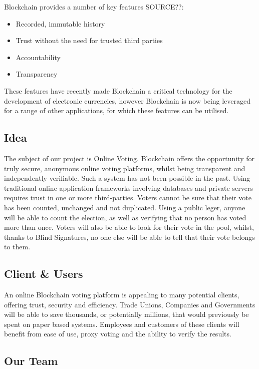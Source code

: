 \documentclass{article}
\begin{document}
\par

Blockchain provides a number of key features SOURCE??:
\begin{itemize}
    \item Recorded, immutable history
    \item Trust without the need for trusted third parties
    \item Accountability
    \item Transparency
\end{itemize}

These features have recently made Blockchain a critical technology for the development of electronic currencies, however Blockchain is now being leveraged for a range of other applications, for which these features can be utilised.

\subsection{Idea}

The subject of our project is Online Voting. Blockchain offers the opportunity for truly secure, anonymous online voting platforms, whilst being transparent and independently verifiable. Such a system has not been possible in the past. Using traditional online application frameworks involving databases and private servers requires trust in one or more third-parties. Voters cannot be sure that their vote has been counted, unchanged and not duplicated. Using a public leger, anyone will be able to count the election, as well as verifying that no person has voted more than once. Voters will also be able to look for their vote in the pool, whilst, thanks to Blind Signatures, no one else will be able to tell that their vote belongs to them.

\subsection{Client \& Users}

An online Blockchain voting platform is appealing to many potential clients, offering trust, security and efficiency. Trade Unions, Companies and Governments will be able to save thousands, or potentially millions, that would previously be spent on paper based systems. Employees and customers of these clients will benefit from ease of use, proxy voting and the ability to verify the results.

\subsection{Our Team}
\end{document}
